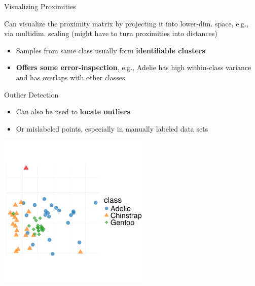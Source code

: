 \documentclass[11pt,compress,t,notes=noshow, xcolor=table]{beamer}
\begin{document}
\begin{vbframe}{Visualizing Proximities}
\lz


Can visualize the proximity matrix by projecting it into lower-dim. space, e.g., via multidim. scaling
(might have to turn proximities into distances)
\begin{itemize}
  \item Samples from same class usually form \textbf{identifiable clusters}
  \item \textbf{Offers some error-inspection}, e.g., Adelie has high within-class variance and has overlaps with other classes
\end{itemize}

\end{vbframe}

\begin{vbframe}{Outlier Detection}

\begin{itemize}
\item Can also be used to \textbf{locate outliers}
\item Or mislabeled points, especially in manually labeled data sets
\end{itemize}

\begin{center}
\includegraphics[width=0.55\textwidth]{figure/forest-prox-vis_2.png}
\end{center}

\end{vbframe}
\end{document}
